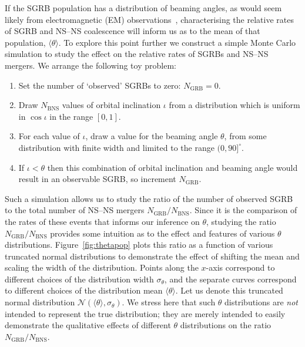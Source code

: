 \documentclass[twocolumn]{aastex61}
\newcommand{\BNS}{\ac{NS}--\ac{NS}\xspace}
\def\electro#1{electromagnetic#1 (EM#1)\gdef\electro{EM}}
\begin{document}
If the \ac{SGRB} population has a distribution of beaming angles, as would seem
likely from \electro{} observations~\cite{Fong:2015oha}, characterising the
relative rates of \ac{SGRB} and \BNS coalescence will inform us as to the mean
of that population, $\langle \theta \rangle$.  To explore this point further we
construct a simple Monte Carlo simulation to study the effect on the relative
rates of \acp{SGRB} and \BNS mergers. We arrange the following toy problem:
%
\begin{enumerate}
    \item Set the number of `observed' \acp{SGRB} to zero: $N_{\mathrm{GRB}}=0$.
    \item Draw $N_{\mathrm{BNS}}$ values of orbital inclination $\iota$ from a distribution which is uniform in $\cos \iota$ in the range $[0,1]$.
    \item For each value of $\iota$, draw a value for the beaming angle $\theta$, from some distribution with finite width and limited to the range $(0,90]^{\circ}$.
    \item If $\iota<\theta$ then this combination of orbital inclination and beaming angle would result in an observable \ac{SGRB}, so increment $N_{\mathrm{GRB}}$.
\end{enumerate}
%
Such a simulation allows us to study the ratio of the number of
observed \ac{SGRB} to the total number of \BNS mergers
$N_{\mathrm{GRB}}/N_{\mathrm{BNS}}$.  Since it is the comparison of
the rates of these events that informs our inference on $\theta$,
studying the ratio $N_{\mathrm{GRB}}/N_{\mathrm{BNS}}$ provides some
intuition as to the effect and features of various $\theta$
distributions.  Figure~\ref{fig:thetapop} plots this ratio as a
function of various truncated normal distributions to demonstrate the
effect of shifting the mean and scaling the width of the distribution.
Points along the $x$-axis correspond to different choices of the
distribution width $\sigma_{\theta}$, and the separate curves
correspond to different choices of the distribution mean
$\langle \theta \rangle$.  Let us denote this truncated normal
distribution ${\mathcal N}(\langle \theta \rangle, \sigma_{\theta})$.
We stress here that such $\theta$ distributions are \emph{not}
intended to represent the true distribution; they are merely intended
to easily demonstrate the qualitative effects of different $\theta$
distributions on the ratio $N_{\mathrm{GRB}}/N_{\mathrm{BNS}}$.
\end{document}
